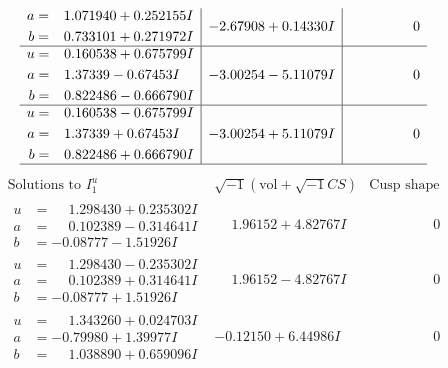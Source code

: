 \documentclass[1p]{elsarticle_modified}
\theoremstyle{definition}
\newcommand{\I}{\sqrt{-1}}
\begin{document}
$$\begin{array}{c|c|c}
\begin{aligned}
a &= \phantom{-}1.071940 + 0.252155 I \\
b &= \phantom{-}0.733101 + 0.271972 I\end{aligned}
 & -2.67908 + 0.14330 I & \phantom{-0.000000 } 0 \\ \hline\begin{aligned}
u &= \phantom{-}0.160538 + 0.675799 I \\
a &= \phantom{-}1.37339 - 0.67453 I \\
b &= \phantom{-}0.822486 - 0.666790 I\end{aligned}
 & -3.00254 - 5.11079 I & \phantom{-0.000000 } 0 \\ \hline\begin{aligned}
u &= \phantom{-}0.160538 - 0.675799 I \\
a &= \phantom{-}1.37339 + 0.67453 I \\
b &= \phantom{-}0.822486 + 0.666790 I\end{aligned}
 & -3.00254 + 5.11079 I & \phantom{-0.000000 } 0\\
 \hline 
 \end{array}$$\newpage$$\begin{array}{c|c|c}  
\text{Solutions to }I^u_{1}& \I (\text{vol} + \sqrt{-1}CS) & \text{Cusp shape}\\
 \hline 
\begin{aligned}
u &= \phantom{-}1.298430 + 0.235302 I \\
a &= \phantom{-}0.102389 - 0.314641 I \\
b &= -0.08777 - 1.51926 I\end{aligned}
 & \phantom{-}1.96152 + 4.82767 I & \phantom{-0.000000 } 0 \\ \hline\begin{aligned}
u &= \phantom{-}1.298430 - 0.235302 I \\
a &= \phantom{-}0.102389 + 0.314641 I \\
b &= -0.08777 + 1.51926 I\end{aligned}
 & \phantom{-}1.96152 - 4.82767 I & \phantom{-0.000000 } 0 \\ \hline\begin{aligned}
u &= \phantom{-}1.343260 + 0.024703 I \\
a &= -0.79980 + 1.39977 I \\
b &= \phantom{-}1.038890 + 0.659096 I\end{aligned}
 & -0.12150 + 6.44986 I & \phantom{-0.000000 } 0 \\ \hline\begin{aligned}

\end{aligned}
\end{array}$$
\end{document}
